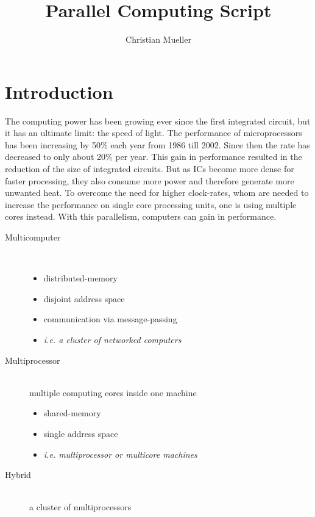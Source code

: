 \documentclass{article}
\author{Christian Mueller}
\title{Parallel Computing Script}
\begin{document}
\maketitle
\tableofcontents

\section{Introduction} %
\label{sec:introduction}
	The computing power has been growing ever since the first integrated circuit,
	but it has an ultimate limit: the speed of light.
	The performance of microprocessors has been increasing by 50\% each year from 1986 till 2002.
	Since then the rate has decreased to only about 20\% per year.
	This gain in performance resulted in the reduction of the size of integrated circuits.
	But as ICs become more dense for faster processing,
	they also consume more power and therefore generate more unwanted heat.
	To overcome the need for higher clock-rates,
	whom are needed to increase the performance on single core processing units,
	one is using multiple cores instead.
	With this parallelism, computers can gain in performance.
	
 	\begin{description}
 		\item[Multicomputer] \hfill \\
 			\begin{itemize}
 				\item distributed-memory
 				\item disjoint address space
 				\item communication via message-passing
 				\item \textsl{i.e. a cluster of networked computers}
 			\end{itemize}
 		\item[Multiprocessor] \hfill \\
 			multiple computing cores inside one machine\\
 			\begin{itemize}
 				\item shared-memory
 				\item single address space
 				\item \textsl{i.e. multiprocessor or multicore machines}
 			\end{itemize}
 		\item[Hybrid] \hfill \\
 			a cluster of multiprocessors
	\end{description}
\end{document}
